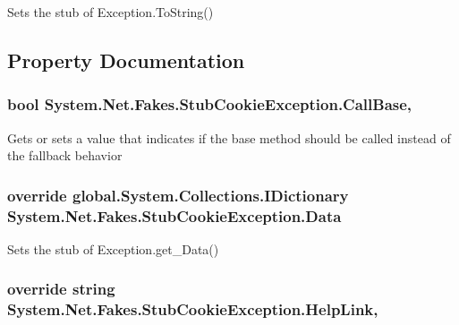 Sets the stub of Exception.\-To\-String()



\subsection{Property Documentation}
\hypertarget{class_system_1_1_net_1_1_fakes_1_1_stub_cookie_exception_aca984f27200168a31f683383eae130d6}{
\subsubsection[{Call\-Base}]{\setlength{\rightskip}{0pt plus 5cm}bool System.\-Net.\-Fakes.\-Stub\-Cookie\-Exception.\-Call\-Base\hspace{0.3cm}{\ttfamily [get]}, {\ttfamily [set]}}}\label{class_system_1_1_net_1_1_fakes_1_1_stub_cookie_exception_aca984f27200168a31f683383eae130d6}


Gets or sets a value that indicates if the base method should be called instead of the fallback behavior

\hypertarget{class_system_1_1_net_1_1_fakes_1_1_stub_cookie_exception_a73da38fcdd5f58be208f0a7331b90a39}{
\subsubsection[{Data}]{\setlength{\rightskip}{0pt plus 5cm}override global.\-System.\-Collections.\-I\-Dictionary System.\-Net.\-Fakes.\-Stub\-Cookie\-Exception.\-Data\hspace{0.3cm}{\ttfamily [get]}}}\label{class_system_1_1_net_1_1_fakes_1_1_stub_cookie_exception_a73da38fcdd5f58be208f0a7331b90a39}


Sets the stub of Exception.\-get\-\_\-\-Data()

\hypertarget{class_system_1_1_net_1_1_fakes_1_1_stub_cookie_exception_ae2ffa18bbaf4d33b301b8fe2d1dd4d70}{
\subsubsection[{Help\-Link}]{\setlength{\rightskip}{0pt plus 5cm}override string System.\-Net.\-Fakes.\-Stub\-Cookie\-Exception.\-Help\-Link\hspace{0.3cm}{\ttfamily [get]}, {\ttfamily [set]}}}\label{class_system_1_1_net_1_1_fakes_1_1_stub_cookie_exception_ae2ffa18bbaf4d33b301b8fe2d1dd4d70}


